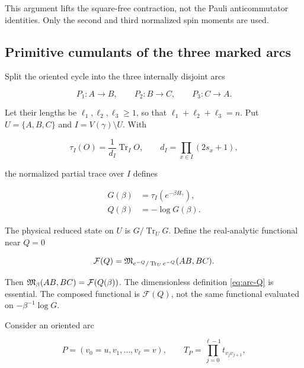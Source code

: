This argument lifts the square-free contraction, not the Pauli
anticommutator identities.  Only the second and third normalized spin
moments are used.

\subsection{Primitive cumulants of the three marked arcs}

Split the oriented cycle into the three internally disjoint arcs

\begin{equation}
 P_1:A\longrightarrow B,
 \qquad
 P_2:B\longrightarrow C,
 \qquad
 P_3:C\longrightarrow A.
 \label{eq:three-marked-arcs}
\end{equation}

Let their lengths be $\ell_1,\ell_2,\ell_3\geq1$, so that
$\ell_1+\ell_2+\ell_3=n$.  Put $U=\{A,B,C\}$ and
$I=V(\gamma)\setminus U$.  With

\begin{equation}
 \tau_I(O)=\frac{1}{d_I}\operatorname{Tr}_I O,
 \qquad
 d_I=\prod_{x\in I}(2s_x+1),
 \label{eq:internal-normalized-trace}
\end{equation}

the normalized partial trace over $I$ defines

\begin{align}
 G(\beta)&=\tau_I(e^{-\beta H_\gamma}),
 \label{eq:arc-G}\\
 Q(\beta)&=-\log G(\beta).
 \label{eq:arc-Q}
\end{align}

The physical reduced state on $U$ is
$G/\operatorname{Tr}_UG$.  Define the real-analytic functional near $Q=0$

\begin{equation}
 \mathcal F(Q)
 =\mathfrak{M}_{e^{-Q}/\operatorname{Tr}_Ue^{-Q}}(AB,BC).
 \label{eq:triangle-functional}
\end{equation}

Then $\mathfrak{M}_\beta(AB,BC)=\mathcal F(Q(\beta))$.  The dimensionless
definition \eqref{eq:arc-Q} is essential.  The composed functional is
$\mathcal F(Q)$, not the same functional evaluated on
$-\beta^{-1}\log G$.

Consider an oriented arc

\begin{equation}
 P=(v_0=u,v_1,\ldots,v_\ell=v),
 \qquad
 T_P=\prod_{j=0}^{\ell-1}t_{v_jv_{j+1}},
 \label{eq:oriented-arc}
\end{equation}


